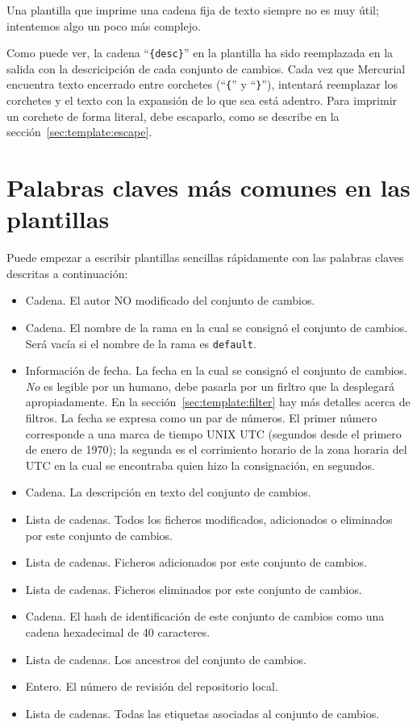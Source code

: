 Una plantilla que imprime una cadena fija de texto siempre no es muy
útil; intentemos algo un poco más complejo.


Como puede ver, la cadena ``\Verb+{desc}+'' en la plantilla ha sido
reemplazada en la salida con la descricipción de cada conjunto de
cambios.  Cada vez que Mercurial encuentra texto encerrado entre
corchetes (``\texttt{\{}'' y ``\texttt{\}}''), intentará reemplazar los
corchetes y el texto con la expansión de lo que sea está adentro.
Para imprimir un corchete de forma literal, debe escaparlo, como se
describe en la sección~\ref{sec:template:escape}.

\section{Palabras claves más comunes en las plantillas}
\label{sec:template:keyword}

Puede empezar a escribir plantillas sencillas rápidamente con las
palabras claves descritas a continuación:

\begin{itemize}
\item[\tplkword{author}] Cadena.  El autor NO modificado del conjunto
  de cambios.
\item[\tplkword{branches}] Cadena.  El nombre de la rama en la cual se
  consignó el conjunto de cambios.  Será vacía si el nombre de la rama es
  \texttt{default}.
\item[\tplkword{date}] Información de fecha.  La fecha en la cual se
  consignó el conjunto de cambios.  \emph{No} es legible por un
  humano, debe pasarla por un firltro que la desplegará
  apropiadamente.  En la sección~\ref{sec:template:filter} hay más
  detalles acerca de filtros.  La fecha se expresa como un par de
  números.  El primer número corresponde a una marca de tiempo UNIX
  UTC (segundos desde el primero de enero de 1970); la segunda es el
  corrimiento horario de la zona horaria del UTC en la cual se encontraba
  quien hizo la consignación, en segundos.
\item[\tplkword{desc}] Cadena.  La descripción en texto del conjunto
  de cambios.
\item[\tplkword{files}] Lista de cadenas.  Todos los ficheros
  modificados, adicionados o eliminados por este conjunto de cambios.
\item[\tplkword{file\_adds}] Lista de cadenas.  Ficheros adicionados
  por este conjunto de cambios.
\item[\tplkword{file\_dels}] Lista de cadenas.  Ficheros eliminados
  por este conjunto de cambios.
\item[\tplkword{node}] Cadena.  El hash de identificación de este
  conjunto de cambios como una cadena hexadecimal de 40 caracteres.
\item[\tplkword{parents}] Lista de cadenas.  Los ancestros del
  conjunto de cambios.
\item[\tplkword{rev}] Entero.  El número de revisión del repositorio
  local.
\item[\tplkword{tags}] Lista de cadenas.  Todas las etiquetas
  asociadas al conjunto de cambios.
\end{itemize}

